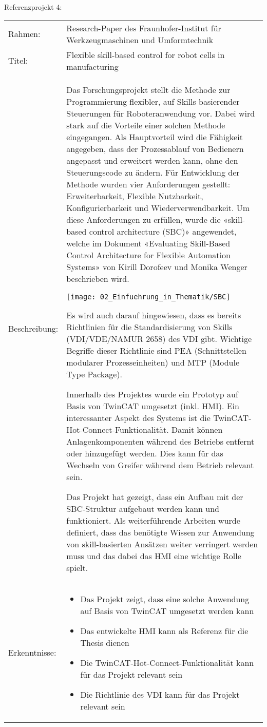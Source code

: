 		\newpage
	
	Referenzprojekt 4:
	\vspace{2mm}
	\\
		\begin{tabularx}{\textwidth}{@{}>{}p{8em} X@{}}
		Rahmen: & 
		Research-Paper des Fraunhofer-Institut für Werkzeugmaschinen und Umformtechnik 
		\\
		
		Titel: & 
		Flexible skill-based control for robot cells in manufacturing
		\\
		
		Beschreibung: & 
		Das Forschungsprojekt stellt die Methode zur Programmierung flexibler, auf Skills basierender Steuerungen für Roboteranwendung vor. Dabei wird stark auf die Vorteile einer solchen Methode eingegangen. Als Hauptvorteil wird die Fähigkeit angegeben, dass der Prozessablauf von Bedienern angepasst und erweitert werden kann, ohne den Steuerungscode zu ändern. Für Entwicklung der Methode wurden vier Anforderungen gestellt: Erweiterbarkeit, Flexible Nutzbarkeit, Konfigurierbarkeit und Wiederverwendbarkeit. Um diese Anforderungen zu erfüllen, wurde die «skill-based control architecture (SBC)» angewendet, welche im Dokument «Evaluating Skill-Based Control Architecture for Flexible Automation Systems» von Kirill Dorofeev und Monika Wenger beschrieben wird. 
		
		\texttt{[image: 02\_Einfuehrung\_in\_Thematik/SBC]}
		
		Es wird auch darauf hingewiesen, dass es bereits Richtlinien für die Standardisierung von Skills (VDI/VDE/NAMUR 2658) des VDI gibt. Wichtige Begriffe dieser Richtlinie sind PEA (Schnittstellen modularer Prozesseinheiten) und MTP (Module Type Package).
		
		Innerhalb des Projektes wurde ein Prototyp auf Basis von TwinCAT umgesetzt (inkl. HMI). Ein interessanter Aspekt des Systems ist die TwinCAT-Hot-Connect-Funktionalität. Damit können Anlagenkomponenten während des Betriebs entfernt oder hinzugefügt werden. Dies kann für das Wechseln von Greifer während dem Betrieb relevant sein. 
		
		Das Projekt hat gezeigt, dass ein Aufbau mit der SBC-Struktur aufgebaut werden kann und funktioniert. Als weiterführende Arbeiten wurde definiert, dass das benötigte Wissen zur Anwendung von skill-basierten Ansätzen weiter verringert werden muss und das dabei das HMI eine wichtige Rolle spielt. 
		\\
		
		Erkenntnisse: & 
		\begin{itemize}
			\item Das Projekt zeigt, dass eine solche Anwendung auf Basis von TwinCAT umgesetzt werden kann
			\item Das entwickelte HMI kann als Referenz für die Thesis dienen
			\item Die TwinCAT-Hot-Connect-Funktionalität kann für das Projekt relevant sein
			\item Die Richtlinie des VDI kann für das Projekt relevant sein
		\end{itemize}
	\end{tabularx}
	
